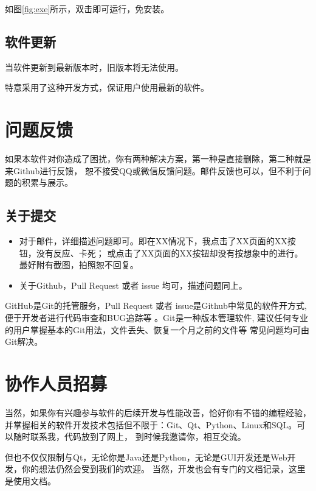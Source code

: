 \documentclass[cn,11pt,chinese, hazy]{elegantbook}
\begin{document}
如图\ref{fig:exe}所示，双击即可运行，免安装。

\subsection{软件更新}

当软件更新到最新版本时，旧版本将无法使用。

\begin{remark}
特意采用了这种开发方式，保证用户使用最新的软件。
\end{remark}

\section{问题反馈}

如果本软件对你造成了困扰，你有两种解决方案，第一种是直接删除，第二种就是来Github进行反馈，
恕不接受QQ或微信反馈问题。邮件反馈也可以，但不利于问题的积累与展示。

\subsection{关于提交}

\begin{itemize}
  \item 对于邮件，详细描述问题即可。即在XX情况下，我点击了XX页面的XX按钮，没有反应、卡死；
  或点击了XX页面的XX按钮却没有按想象中的进行。最好附有截图，拍照恕不回复。
  \item 关于Github，Pull Request 或者 issue 均可，描述问题同上。
\end{itemize}

\begin{remark}
    GitHub是Git的托管服务，Pull Request 或者 issue是Github中常见的软件开方式, 便于开发者进行代码审查和BUG追踪等
    。Git是一种版本管理软件, 建议任何专业的用户掌握基本的Git用法，文件丢失、恢复一个月之前的文件等
    常见问题均可由Git解决。
\end{remark}

\section{协作人员招募}

当然，如果你有兴趣参与软件的后续开发与性能改善，恰好你有不错的编程经验，
并掌握相关的软件开发技术包括但不限于：Git、Qt、Python、Linux和SQL。可以随时联系我，代码放到了网上，
到时候我邀请你，相互交流。

但也不仅仅限制与Qt，无论你是Java还是Python，无论是GUI开发还是Web开发，你的想法仍然会受到我们的欢迎。
当然，开发也会有专门的文档记录，这里是使用文档。
\end{document}
